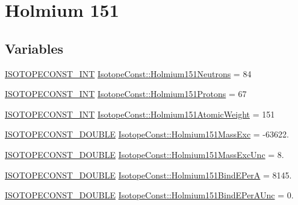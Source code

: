 \hypertarget{group___isotope_const-_holmium-_ho151}{}\section{Holmium 151}
\label{group___isotope_const-_holmium-_ho151}
\subsection*{Variables}
\begin{DoxyCompactItemize}
\item 
\mbox{\hyperlink{group___isotope_const-_macros_ga5f18360b3e99483a35c32d789e62621c}{I\+S\+O\+T\+O\+P\+E\+C\+O\+N\+S\+T\+\_\+\+I\+NT}} \mbox{\hyperlink{group___isotope_const-_holmium-_ho151_gabb640538f16d1656ce940c818d338071}{Isotope\+Const\+::\+Holmium151\+Neutrons}} = 84
\item 
\mbox{\hyperlink{group___isotope_const-_macros_ga5f18360b3e99483a35c32d789e62621c}{I\+S\+O\+T\+O\+P\+E\+C\+O\+N\+S\+T\+\_\+\+I\+NT}} \mbox{\hyperlink{group___isotope_const-_holmium-_ho151_ga324bb905211ed9be1806de9063aaf3c4}{Isotope\+Const\+::\+Holmium151\+Protons}} = 67
\item 
\mbox{\hyperlink{group___isotope_const-_macros_ga5f18360b3e99483a35c32d789e62621c}{I\+S\+O\+T\+O\+P\+E\+C\+O\+N\+S\+T\+\_\+\+I\+NT}} \mbox{\hyperlink{group___isotope_const-_holmium-_ho151_gac1715119eaf83d862aec195ef7583d73}{Isotope\+Const\+::\+Holmium151\+Atomic\+Weight}} = 151
\item 
\mbox{\hyperlink{group___isotope_const-_macros_ga8f45a7272ce02c0b4c65c44636ed719a}{I\+S\+O\+T\+O\+P\+E\+C\+O\+N\+S\+T\+\_\+\+D\+O\+U\+B\+LE}} \mbox{\hyperlink{group___isotope_const-_holmium-_ho151_ga42e6ea5f49b183c026bea18cd736cd84}{Isotope\+Const\+::\+Holmium151\+Mass\+Exc}} = -\/63622.
\item 
\mbox{\hyperlink{group___isotope_const-_macros_ga8f45a7272ce02c0b4c65c44636ed719a}{I\+S\+O\+T\+O\+P\+E\+C\+O\+N\+S\+T\+\_\+\+D\+O\+U\+B\+LE}} \mbox{\hyperlink{group___isotope_const-_holmium-_ho151_ga6b1ce228a2f6dd305a60acf054f2b15d}{Isotope\+Const\+::\+Holmium151\+Mass\+Exc\+Unc}} = 8.
\item 
\mbox{\hyperlink{group___isotope_const-_macros_ga8f45a7272ce02c0b4c65c44636ed719a}{I\+S\+O\+T\+O\+P\+E\+C\+O\+N\+S\+T\+\_\+\+D\+O\+U\+B\+LE}} \mbox{\hyperlink{group___isotope_const-_holmium-_ho151_ga6a38c03411320be9fc10e2713b82ac9d}{Isotope\+Const\+::\+Holmium151\+Bind\+E\+PerA}} = 8145.
\item 
\mbox{\hyperlink{group___isotope_const-_macros_ga8f45a7272ce02c0b4c65c44636ed719a}{I\+S\+O\+T\+O\+P\+E\+C\+O\+N\+S\+T\+\_\+\+D\+O\+U\+B\+LE}} \mbox{\hyperlink{group___isotope_const-_holmium-_ho151_gaa70d691e34db97d01d48d569b401eab6}{Isotope\+Const\+::\+Holmium151\+Bind\+E\+Per\+A\+Unc}} = 0.

\end{DoxyCompactItemize}
